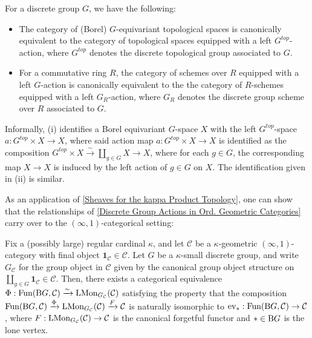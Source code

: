 \documentclass[10pt]{article}
\newcommand{\C}{\mathcal C}
\theoremstyle{witharg}
\theoremstyle{witharg}
\theoremstyle{witharg2}
\begin{document}
\begin{example}{}\label{Discrete Group Actions in Ord. Geometric Categories}

\noindent For a discrete group $G$, we have the following:

    \begin{itemize}
    
        \item [\textnormal{(i)}] The category of (Borel) $G$-equivariant topological spaces is canonically equivalent to the category of topological spaces equipped with a left $G^{top}$-action, where $G^{top}$ denotes the discrete topological group associated to $G$. 

        \item [\textnormal{(ii)}] For a commutative ring $R$, the category of schemes over $R$ equipped with a left $G$-action is canonically equivalent to the the category of $R$-schemes equipped with a left $G_{R}$-action, where $G_{R}$ denotes the discrete group scheme over $R$ associated to $G$.
        
    \end{itemize} 

\noindent Informally, \textnormal{(i)} identifies a Borel equivariant $G$-space $X$ with the left $G^{top}$-space $a:G^{top}\times X\rightarrow X$, where said action map $a:G^{top}\times X\rightarrow X$ is identified as the composition $G^{top}\times X\xrightarrow{\sim}\coprod_{g\in G}X\rightarrow X$, where for each $g\in G$, the corresponding map $X\rightarrow X$ is induced by the left action of $g\in G$ on $X$. The identification given in \textnormal{(ii)} is similar. 

\end{example}

As an application of \ref{Sheaves for the kappa Product Topology}, one can show that the relationships of \ref{Discrete Group Actions in Ord. Geometric Categories} carry over to the $(\infty,1)$-categorical setting: 


\begin{proposition}{}\label{Internal Vs External Group Objects Theorem}

    Fix a (possibly large) regular cardinal $\kappa$, and let $\C$ be a $\kappa$-geometric $(\infty,1)$-category with final object $\bm{1}_\C\in \C$. Let $G$ be a $\kappa$-small discrete group, and write $G_\C$ for the group object in $\C$ given by the canonical group object structure on $\coprod_{g\in G}\bm{1}_\C\in \C$. Then, there exists a categorical equivalence $\Phi:\textnormal{Fun}(\textnormal{B}G,\C)\xrightarrow{\sim} \textnormal{LMon}_{G_\C}(\C)$ satisfying the property that the composition $\textnormal{Fun}(\textnormal{B}G,\C)\xrightarrow{\Phi} \textnormal{LMon}_{G_\C}(\C)\xrightarrow{F}\C$ is naturally isomorphic to $\textnormal{ev}_*:\textnormal{Fun}(\textnormal{B}G,\C)\rightarrow \C$, where $F:\textnormal{LMon}_{G_\C}(\C)\rightarrow \C$ is the canonical forgetful functor and $*\in \textnormal{B}G$ is the lone vertex.

\end{proposition}
\end{document}
